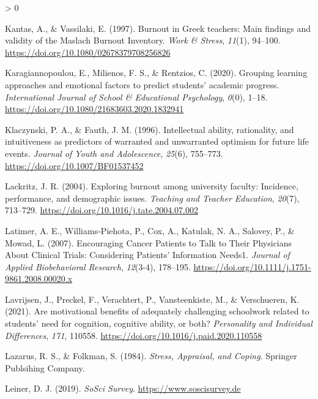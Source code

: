 \documentclass[
  english,
  man,floatsintext]{apa6}
\newlength{\cslhangindent}
\newenvironment{CSLReferences}[2] %
 {%
  \setlength{\parindent}{0pt}
  \ifodd #1 \everypar{\setlength{\hangindent}{\cslhangindent}}\ignorespaces\fi
  \ifnum #2 > 0
  \setlength{\parskip}{#2\baselineskip}
  \fi
 }%
 {}
\begin{document}
\begin{CSLReferences}{1}{0}
\leavevmode\hypertarget{ref-Kantas1997}{}%
Kantas, A., \& Vassilaki, E. (1997). Burnout in {Greek} teachers: {Main} findings and validity of the {Maslach} {Burnout} {Inventory}. \emph{Work \& Stress}, \emph{11}(1), 94--100. \url{https://doi.org/10.1080/02678379708256826}

\leavevmode\hypertarget{ref-Karagiannopoulou2020}{}%
Karagiannopoulou, E., Milienos, F. S., \& Rentzios, C. (2020). Grouping learning approaches and emotional factors to predict students' academic progress. \emph{International Journal of School \& Educational Psychology}, \emph{0}(0), 1--18. \url{https://doi.org/10.1080/21683603.2020.1832941}

\leavevmode\hypertarget{ref-Klaczynski1996}{}%
Klaczynski, P. A., \& Fauth, J. M. (1996). Intellectual ability, rationality, and intuitiveness as predictors of warranted and unwarranted optimism for future life events. \emph{Journal of Youth and Adolescence}, \emph{25}(6), 755--773. \url{https://doi.org/10.1007/BF01537452}

\leavevmode\hypertarget{ref-Lackritz2004}{}%
Lackritz, J. R. (2004). Exploring burnout among university faculty: Incidence, performance, and demographic issues. \emph{Teaching and Teacher Education}, \emph{20}(7), 713--729. \url{https://doi.org/10.1016/j.tate.2004.07.002}

\leavevmode\hypertarget{ref-Latimer2007}{}%
Latimer, A. E., Williams‐Piehota, P., Cox, A., Katulak, N. A., Salovey, P., \& Mowad, L. (2007). Encouraging {Cancer} {Patients} to {Talk} to {Their} {Physicians} {About} {Clinical} {Trials}: {Considering} {Patients}' {Information} {Needs1}. \emph{Journal of Applied Biobehavioral Research}, \emph{12}(3-4), 178--195. \url{https://doi.org/10.1111/j.1751-9861.2008.00020.x}

\leavevmode\hypertarget{ref-Lavrijsen2021}{}%
Lavrijsen, J., Preckel, F., Verachtert, P., Vansteenkiste, M., \& Verschueren, K. (2021). Are motivational benefits of adequately challenging schoolwork related to students' need for cognition, cognitive ability, or both? \emph{Personality and Individual Differences}, \emph{171}, 110558. \url{https://doi.org/10.1016/j.paid.2020.110558}

\leavevmode\hypertarget{ref-Lazarus1984}{}%
Lazarus, R. S., \& Folkman, S. (1984). \emph{Stress, {Appraisal}, and {Coping}}. Springer Publsihing Company.

\leavevmode\hypertarget{ref-Leiner2019}{}%
Leiner, D. J. (2019). \emph{{SoSci} {Survey}}. \url{https://www.soscisurvey.de}


\end{CSLReferences}
\end{document}
